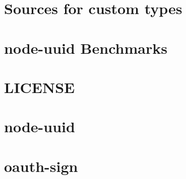 \documentclass[twoside]{book}
\newcommand{\+}{\discretionary{\mbox{\scriptsize$\hookleftarrow$}}{}{}}
\begin{document}
\chapter{Sources for custom types}
\label{md__c_1__users_martin__documents__git_hub_visual_studio__bachelor__wis_r__wis_r_node_modules_gru749236ef0bbfcf16866e488ff8b07969}
\hypertarget{md__c_1__users_martin__documents__git_hub_visual_studio__bachelor__wis_r__wis_r_node_modules_gru749236ef0bbfcf16866e488ff8b07969}{}

\chapter{node-\/uuid Benchmarks}
\label{md__c_1__users_martin__documents__git_hub_visual_studio__bachelor__wis_r__wis_r_node_modules_grud32facd031f7012f23ffa0c8db19ab58}
\hypertarget{md__c_1__users_martin__documents__git_hub_visual_studio__bachelor__wis_r__wis_r_node_modules_grud32facd031f7012f23ffa0c8db19ab58}{}

\chapter{L\+I\+C\+E\+N\+S\+E}
\label{md__c_1__users_martin__documents__git_hub_visual_studio__bachelor__wis_r__wis_r_node_modules_gruf9694edb3ed1d081d07b18fe6d0ed9ac}
\hypertarget{md__c_1__users_martin__documents__git_hub_visual_studio__bachelor__wis_r__wis_r_node_modules_gruf9694edb3ed1d081d07b18fe6d0ed9ac}{}

\chapter{node-\/uuid}
\label{md__c_1__users_martin__documents__git_hub_visual_studio__bachelor__wis_r__wis_r_node_modules_gruf7c8e142bb77063b357ad716e355bf26}
\hypertarget{md__c_1__users_martin__documents__git_hub_visual_studio__bachelor__wis_r__wis_r_node_modules_gruf7c8e142bb77063b357ad716e355bf26}{}

\chapter{oauth-\/sign}
\label{md__c_1__users_martin__documents__git_hub_visual_studio__bachelor__wis_r__wis_r_node_modules_gruca72f296a8c5dc4a7ae17d7596ee762c}
\hypertarget{md__c_1__users_martin__documents__git_hub_visual_studio__bachelor__wis_r__wis_r_node_modules_gruca72f296a8c5dc4a7ae17d7596ee762c}{}

\end{document}
